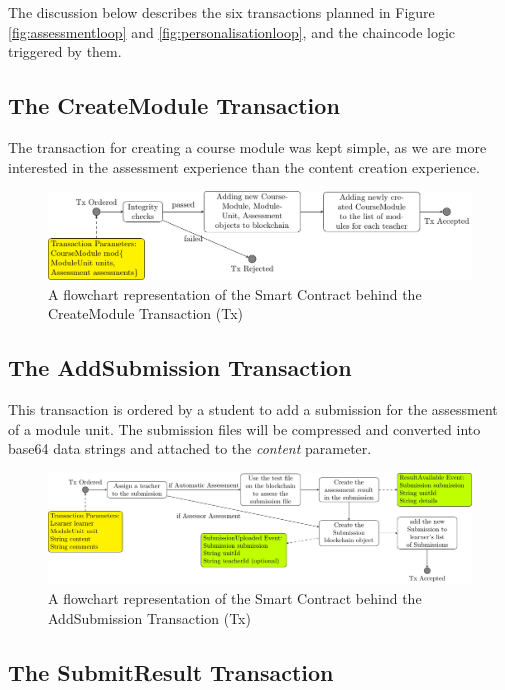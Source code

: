 The discussion below describes the six transactions planned in Figure \ref{fig:assessmentloop} and \ref{fig:personalisationloop}, 
and the chaincode logic triggered by them.

\subsection{The CreateModule Transaction}

The transaction for creating a course module was kept simple, as we are more interested in the assessment experience than the 
content creation experience.

\begin{figure}[!ht]
    \centering
    \includegraphics[width=1.0\textwidth]{cmtx}
    \caption{A flowchart representation of the Smart Contract behind the CreateModule Transaction (Tx)} \label{fig:cmtx}
\end{figure}

\subsection{The AddSubmission Transaction}

This transaction is ordered by a student to add a submission for the assessment of a module unit. The submission files will be 
compressed and converted into base64 data strings and attached to the \textit{content} parameter.

\begin{figure}[!ht]
    \centering
    \includegraphics[width=1.0\textwidth]{astx}
    \caption{A flowchart representation of the Smart Contract behind the AddSubmission Transaction (Tx)} \label{fig:astx}
\end{figure}

\subsection{The SubmitResult Transaction}

